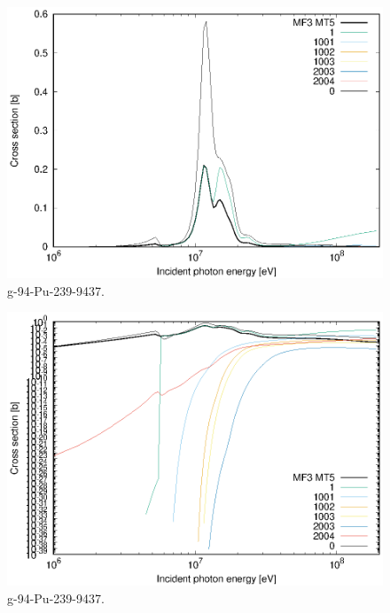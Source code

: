 \begin{figure}
 \includegraphics[width=\linewidth]{eps/g_94-Pu-239_9437.eps}
  \caption{g-94-Pu-239-9437.}
\end{figure}
\begin{figure}
 \includegraphics[width=\linewidth]{eps-log/g_94-Pu-239_9437.eps}
 \caption{g-94-Pu-239-9437.}
\end{figure}
\newpage \clearpage


